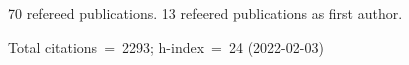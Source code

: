 70 refereed publications. 13 refeered publications as first author.

Total citations~=~2293; h-index~=~24 (2022-02-03)